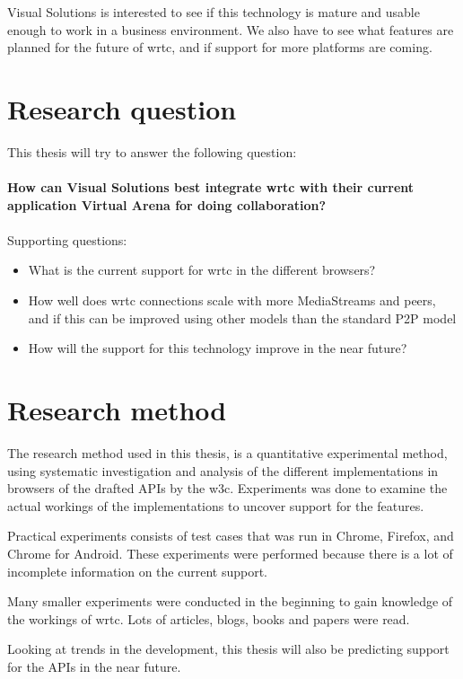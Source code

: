 Visual Solutions is interested to see if this technology is mature and usable enough to work in a business environment. We also have to see what features are planned for the future of \gls{wrtc}, and if support for more platforms are coming.


\section{Research question}
This thesis will try to answer the following question:
\\
\\
\textbf{How can Visual Solutions best integrate \gls{wrtc} with their current application Virtual Arena for doing collaboration?}
\\
\\
Supporting questions:

\begin{itemize}
    \item What is the current support for \gls{wrtc} in the different browsers?
    \item How well does \gls{wrtc} connections scale with more MediaStreams and peers, and if this can be improved using other models than the standard P2P model
    \item How will the support for this technology improve in the near future?
\end{itemize}


\section{Research method}
The research method used in this thesis, is a quantitative experimental method, using systematic investigation and analysis of the different implementations in browsers of the drafted APIs by the \gls{w3c}. Experiments was done to examine the actual workings of the implementations to uncover support for the features.

Practical experiments consists of test cases that was run in Chrome, Firefox, and Chrome for Android. These experiments were performed because there is a lot of incomplete information on the current support.

Many smaller experiments were conducted in the beginning to gain knowledge of the workings of \gls{wrtc}. Lots of articles, blogs, books and papers were read.

Looking at trends in the development, this thesis will also be predicting support for the APIs in the near future. 


